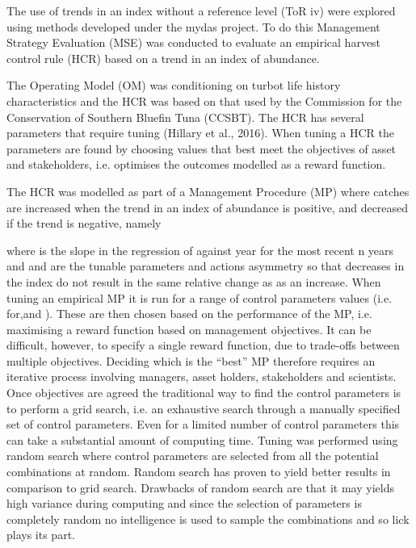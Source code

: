 \documentclass[12pt,doublespacing,a4paper]{ouparticle}
\begin{document}
The use of trends in an index without a reference level (ToR iv) were explored using methods developed under the mydas project.  To do this Management Strategy Evaluation (MSE) was conducted to evaluate an empirical harvest control rule (HCR) based on a trend in an index of abundance. 

The  Operating Model (OM) was conditioning on turbot life history characteristics and the HCR was based on that used by the Commission for the Conservation of Southern Bluefin Tuna (CCSBT). The HCR has several parameters that require tuning (Hillary et al., 2016). When tuning a HCR the parameters are found by choosing values that best meet the objectives of  asset and stakeholders, i.e. optimises the outcomes modelled as a reward function. 

The HCR was modelled as part of a  Management Procedure (MP) where catches are increased when the trend in an index of abundance is positive, and decreased if the trend is negative, namely

where  is the slope in the regression of  against year for the most recent n years and  and  are  the tunable parameters and actions asymmetry so that decreases in the index do not result in the same relative change as as an increase.
When tuning an empirical MP it is run for a range of control parameters values (i.e. for,and ). These are then chosen based on the performance of the MP, i.e.  maximising a reward function based on management objectives. It can be difficult, however, to specify a single reward function, due to trade-offs between multiple objectives. Deciding which is the “best” MP therefore requires an iterative process involving managers, asset holders, stakeholders and scientists.
Once objectives are agreed the traditional way to find the control parameters is to perform  a grid search, i.e. an exhaustive search through a manually specified set of control parameters. Even for a limited number of control parameters this can take a substantial amount of computing time. Tuning was performed using random search where control parameters are selected from all the potential combinations at random.  Random search has proven to yield better results in comparison to grid search. Drawbacks of random search are that it may yields high variance during computing and since the selection of parameters is completely random no intelligence is used to sample the combinations and so lick plays its part. 
\end{document}
